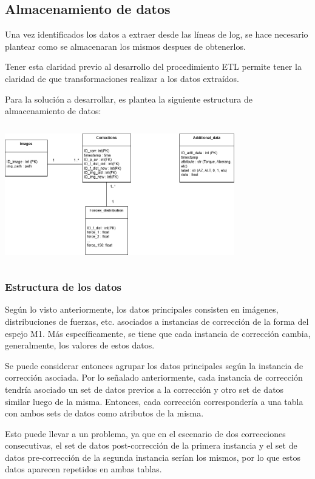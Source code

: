 \subsection{Almacenamiento de datos}

Una vez identificados los datos a extraer desde las líneas de log, se hace necesario plantear como se almacenaran los mismos despues de obtenerlos. 

Tener esta claridad previo al desarrollo del procedimiento ETL permite tener la claridad de que transformaciones realizar a los datos extraídos.

Para la solución a desarrollar, es plantea la siguiente estructura de almacenamiento de datos:

\includegraphics[width=10cm,height=6cm]{figures/db_diagram.png} \\

\subsubsection{Estructura de los datos}

Según lo visto anteriormente, los datos principales consisten en imágenes, distribuciones de fuerzas, etc. asociados a instancias de corrección de la forma del espejo M1. Más específicamente, se tiene que cada instancia de corrección cambia, generalmente, los valores de estos datos. 

Se puede considerar entonces agrupar los datos principales según la instancia de corrección asociada. Por lo señalado anteriormente, cada instancia de corrección tendría asociado un set de datos previos a la corrección y otro set de datos similar luego de la misma. Entonces, cada corrección correspondería a una tabla con ambos sets de datos como atributos de la misma.

Esto puede llevar a un problema, ya que en el escenario de dos correcciones consecutivas, el set de datos post-corrección de la primera instancia y el set de datos pre-corrección de la segunda instancia serían los mismos, por lo que estos datos aparecen repetidos en ambas tablas.

